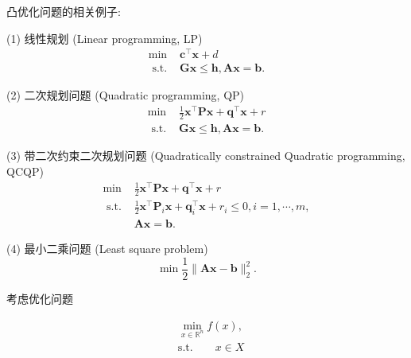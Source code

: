 \begin{example}凸优化问题的相关例子:
\par    (1) 线性规划 (Linear programming, LP)\cite{1963Linear}
    \begin{equation}
    \begin{array}{ll}
    \min & \bm{c}^{\top} \bm{x}+d \\
    \text { s.t. } & \bm{G} \bm{x} \leq \bm{h}, \bm{A} \bm{x}=\bm{b} .
    \end{array}
        \nonumber
    \end{equation}
\par    (2) 二次规划问题 (Quadratic programming, QP)\cite{1995Sequential}
    \begin{equation}
    \begin{array}{ll}
    \min & \frac{1}{2} \bm{x}^{\top} \bm{P} \bm{x}+\bm{q}^{\top} \bm{x}+r \\
    \text { s.t. } & \bm{G} \bm{x} \leq \bm{h}, \bm{A} \bm{x}=\bm{b} .
    \end{array}
        \nonumber
    \end{equation}
\par    (3) 带二次约束二次规划问题 (Quadratically constrained Quadratic programming, QCQP)\cite{1982Quadratically}
    \begin{equation}
    \begin{array}{ll}
    \min & \frac{1}{2} \bm{x}^{\top} \bm{P} \bm{x}+\bm{q}^{\top} \bm{x}+r \\
    \text { s.t. } & \frac{1}{2} \bm{x}^{\top} \bm{P}_{i} \bm{x}+\bm{q}_{i}^{\top} \bm{x}+r_{i} \leq 0, i=1, \cdots, m ,\\
    & \bm{A} \bm{x}=\bm{b} .
    \end{array}
        \nonumber
    \end{equation}
\par (4) 最小二乘问题 (Least square problem)\cite{1989Least}
    \begin{equation}
    \min \frac{1}{2}\|\bm{A} \bm{x}-\bm{b}\|_{2}^{2} .
        \nonumber
    \end{equation}
\end{example}

考虑优化问题

\begin{equation}
    \begin{split}
        &\mathop{\mathrm{min}}\limits_{x\in \mathbb{R}^{n}} f(x), \\
        &\mathrm{s. t.} \quad\quad x\in X
    \end{split}
\end{equation}

